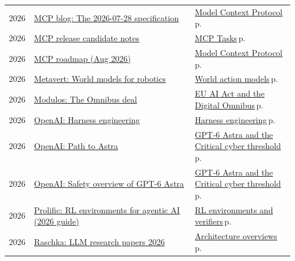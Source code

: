 \documentclass[10pt,a4paper,openany]{report}
\begin{document}
{\begin{longtable}{@{}p{0.07\linewidth}>{\raggedright}p{0.55\linewidth}>{\raggedright\arraybackslash}p{0.34\linewidth}@{}}
2026 & \href{https://blog.modelcontextprotocol.io/posts/2026-07-28/}{MCP blog: The 2026-07-28 specification} & \hyperref[c:protocols-0]{Model Context Protocol}\,{\color{muted}\scriptsize p.\,\pageref{c:protocols-0}}\\
2026 & \href{https://blog.modelcontextprotocol.io/posts/2026-07-28-release-candidate/}{MCP release candidate notes} & \hyperref[c:protocols-2]{MCP Tasks}\,{\color{muted}\scriptsize p.\,\pageref{c:protocols-2}}\\
2026 & \href{https://blog.modelcontextprotocol.io/posts/mcp-roadmap/}{MCP roadmap (Aug 2026)} & \hyperref[c:protocols-0]{Model Context Protocol}\,{\color{muted}\scriptsize p.\,\pageref{c:protocols-0}}\\
2026 & \href{https://metavert.io/world-models-for-robotics}{Metavert: World models for robotics} & \hyperref[c:embodied-1]{World action models}\,{\color{muted}\scriptsize p.\,\pageref{c:embodied-1}}\\
2026 & \href{https://www.modulos.ai/blog/eu-ai-act-omnibus-deal}{Modulos: The Omnibus deal} & \hyperref[c:safety-11]{EU AI Act and the Digital Omnibus}\,{\color{muted}\scriptsize p.\,\pageref{c:safety-11}}\\
2026 & \href{https://openai.com/index/harness-engineering/}{OpenAI: Harness engineering} & \hyperref[c:agents-1]{Harness engineering}\,{\color{muted}\scriptsize p.\,\pageref{c:agents-1}}\\
2026 & \href{https://openai.com/index/path-to-astra/}{OpenAI: Path to Astra} & \hyperref[c:landscape-1]{GPT-6 Astra and the Critical cyber threshold}\,{\color{muted}\scriptsize p.\,\pageref{c:landscape-1}}\\
2026 & \href{https://openai.com/index/safety-overview-gpt-6-astra/}{OpenAI: Safety overview of GPT-6 Astra} & \hyperref[c:landscape-1]{GPT-6 Astra and the Critical cyber threshold}\,{\color{muted}\scriptsize p.\,\pageref{c:landscape-1}}\\
2026 & \href{https://www.prolific.com/resources/rl-environments-for-agentic-ai-the-2026-guide-to-building-and-deploying-enterprise-rl-environments}{Prolific: RL environments for agentic AI (2026 guide)} & \hyperref[c:reasoning-5]{RL environments and verifiers}\,{\color{muted}\scriptsize p.\,\pageref{c:reasoning-5}}\\
2026 & \href{https://magazine.sebastianraschka.com/p/llm-research-papers-2026-part1}{Raschka: LLM research papers 2026} & \hyperref[c:arch-12]{Architecture overviews}\,{\color{muted}\scriptsize p.\,\pageref{c:arch-12}}\\

\end{longtable}}
\end{document}
